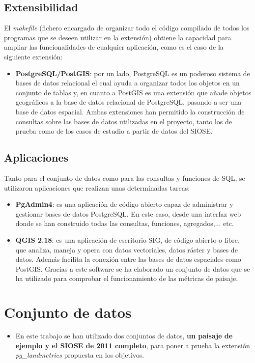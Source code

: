 \subsection{Extensibilidad}
El \textit{makefile} (fichero encargado de organizar todo el código compilado de todos los programas que se deseen utilizar en la extensión) obtiene la capacidad para ampliar las funcionalidades de cualquier aplicación, como es el caso de la siguiente extensión:
\begin{itemize}
\item\textbf{PostgreSQL/PostGIS}: por un lado, PostgreSQL es un poderoso sistema de bases de datos relacional el cual ayuda a organizar todos los objetos en un conjunto de tablas y, en cuanto a PostGIS es una extensión que añade objetos geográficos a la base de datos relacional de PostgreSQL, pasando a ser una base de datos espacial. Ambas extensiones han permitido la construcción de consultas sobre las bases de datos utilizadas en el proyecto, tanto los de prueba como de los casos de estudio a partir de datos del SIOSE.
\end{itemize}

\subsection{Aplicaciones}
Tanto para el conjunto de datos como para las consultas y funciones de SQL, se utilizaron aplicaciones que realizan unas determinadas tareas:
\begin{itemize}
\item\textbf{PgAdmin4}: es una aplicación de código abierto capaz de administrar y gestionar bases de datos PostgreSQL. En este caso, desde una interfaz web donde se han construido todas las consultas, funciones, agregados,... etc.
\item\textbf{QGIS 2.18}: es una aplicación de escritorio SIG, de código abierto o libre, que analiza, maneja y opera con datos vectoriales, datos ráster y bases de datos. Además facilita la conexión entre las bases de datos espaciales como PostGIS. Gracias a este software se ha elaborado un conjunto de datos que se ha utilizado para comprobar el funcionamiento de las métricas de paisaje.
\end{itemize}

\section{Conjunto de datos}

\begin{graybox}
\begin{itemize}
\item En este trabajo se han utilizado dos conjuntos de datos, \textbf{un paisaje de ejemplo y el SIOSE de 2011 completo}, para poner a prueba la extensión \textit{pg\_landmetrics} propuesta en los objetivos.
\end{itemize}
\end{graybox}

